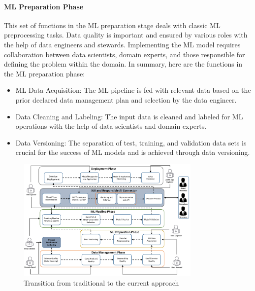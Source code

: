 \documentclass[conference]{IEEEtran}
\begin{document}
\paragraph{ML Preparation Phase} This set of functions in the ML preparation stage deals with classic ML preprocessing tasks. Data quality is important and ensured by various roles with the help of data engineers and stewards. Implementing the ML model requires collaboration between data scientists, domain experts, and those responsible for defining the problem within the domain. In summary, here are the functions in the ML preparation phase:
\begin{itemize}
	\item ML Data Acquisition: The ML pipeline is fed with relevant data based on the prior declared data management plan and selection by the data engineer.
	\item Data Cleaning and Labeling: The input data is cleaned and labeled for ML operations with the help of data scientists and domain experts.
	\item Data Versioning: The separation of test, training, and validation data sets is crucial for the success of ML models and is achieved through data versioning.
\end{itemize}

\begin{figure}[h!]
	\centering
	\includegraphics[width=0.8\textwidth]{ML-OPS_with_XAI.png}
	\caption{Transition from traditional to the current approach}
	\label{XRc-phase}
\end{figure}
\end{document}
